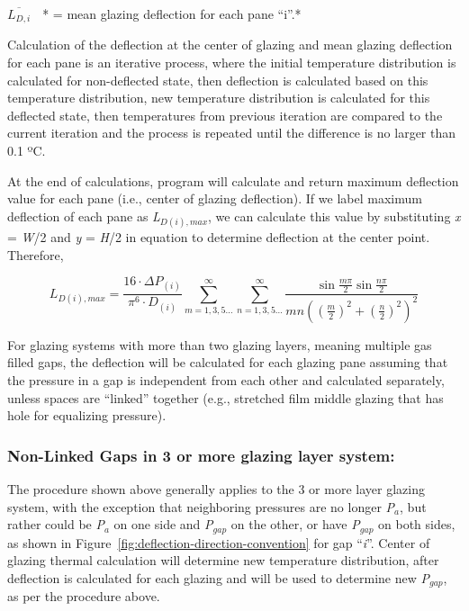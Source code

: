 \(\overline {{L_{D,i}}}\) \textbf{\emph{~}}* = mean glazing deflection for each pane ``i''.*

Calculation of the deflection at the center of glazing and mean glazing deflection for each pane is an iterative process, where the initial temperature distribution is calculated for non-deflected state, then deflection is calculated based on this temperature distribution, new temperature distribution is calculated for this deflected state, then temperatures from previous iteration are compared to the current iteration and the process is repeated until the difference is no larger than 0.1 ºC.

At the end of calculations, program will calculate and return maximum deflection value for each pane (i.e., center of glazing deflection). If we label maximum deflection of each pane as \emph{L\(_{D(i),max}\)}, we can calculate this value by substituting \emph{x} = \emph{W}/2 and \emph{y} = \emph{H}/2 in equation to determine deflection at the center point. Therefore,

\begin{equation}
{L_{D\left( i \right),max}} = \frac{{16\cdot \Delta {P_{\left( i \right)}}}}{{{\pi ^6}\cdot {D_{\left( i \right)}}}}\mathop \sum \limits_{m = 1,3,5 \ldots }^\infty  \mathop \sum \limits_{n = 1,3,5 \ldots }^\infty  \frac{{\sin \frac{{m\pi }}{2}\sin \frac{{n\pi }}{2}}}{{mn{{\left( {{{\left( {\frac{m}{2}} \right)}^2} + {{\left( {\frac{n}{2}} \right)}^2}} \right)}^2}}}
\end{equation}

For glazing systems with more than two glazing layers, meaning multiple gas filled gaps, the deflection will be calculated for each glazing pane assuming that the pressure in a gap is independent from each other and calculated separately, unless spaces are ``linked'' together (e.g., stretched film middle glazing that has hole for equalizing pressure).

\subsubsection{Non-Linked Gaps in 3 or more glazing layer system:}\label{non-linked-gaps-in-3-or-more-glazing-layer-system}

The procedure shown above generally applies to the 3 or more layer glazing system, with the exception that neighboring pressures are no longer \emph{P\(_{a}\)}, but rather could be \emph{P\(_{a}\)} on one side and \emph{P\(_{gap}\)} on the other, or have \emph{P\(_{gap}\)} on both sides, as shown in Figure~\ref{fig:deflection-direction-convention} for gap ``\emph{i}''. Center of glazing thermal calculation will determine new temperature distribution, after deflection is calculated for each glazing and will be used to determine new \emph{P\(_{gap}\)}, as per the procedure above.

